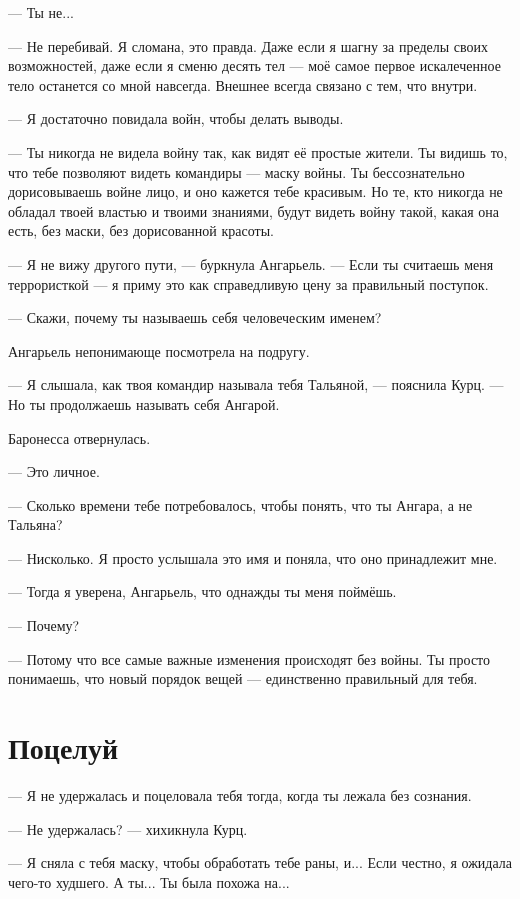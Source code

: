 --- Ты не...

--- Не перебивай.
Я сломана, это правда.
Даже если я шагну за пределы своих возможностей, даже если я сменю десять тел --- моё самое первое искалеченное тело останется со мной навсегда.
Внешнее всегда связано с тем, что внутри.

--- Я достаточно повидала войн, чтобы делать выводы.

--- Ты никогда не видела войну так, как видят её простые жители.
Ты видишь то, что тебе позволяют видеть командиры --- маску войны.
Ты бессознательно дорисовываешь войне лицо, и оно кажется тебе красивым.
Но те, кто никогда не обладал твоей властью и твоими знаниями, будут видеть войну такой, какая она есть, без маски, без дорисованной красоты.

--- Я не вижу другого пути, --- буркнула Ангарьель.
--- Если ты считаешь меня террористкой --- я приму это как справедливую цену за правильный поступок.

--- Скажи, почему ты называешь себя человеческим именем?

Ангарьель непонимающе посмотрела на подругу.

--- Я слышала, как твоя командир называла тебя Тальяной, --- пояснила Курц.
--- Но ты продолжаешь называть себя Ангарой.

Баронесса отвернулась.

--- Это личное.

--- Сколько времени тебе потребовалось, чтобы понять, что ты Ангара, а не Тальяна?

--- Нисколько.
Я просто услышала это имя и поняла, что оно принадлежит мне.

--- Тогда я уверена, Ангарьель, что однажды ты меня поймёшь.

--- Почему?

--- Потому что все самые важные изменения происходят без войны.
Ты просто понимаешь, что новый порядок вещей --- единственно правильный для тебя.

\section{Поцелуй}

--- Я не удержалась и поцеловала тебя тогда, когда ты лежала без сознания.

--- Не удержалась? --- хихикнула Курц.

--- Я сняла с тебя маску, чтобы обработать тебе раны, и...
Если честно, я ожидала чего-то худшего.
А ты...
Ты была похожа на...

